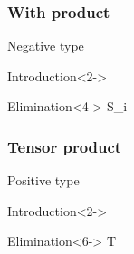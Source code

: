 \documentclass[fleqn]{beamer}
\begin{document}
  \begin{frame}
    \frametitle{With product}
    \begin{block}{}
      Negative type
    \end{block}
    \begin{block}{Introduction}<2->
                {\alert<3>{\ctx{\Gamma}{\Delta}} \vdash {} \ni {}}
    \end{block}
    \begin{block}{Elimination}<4->
                {\alert<5>{\ctx{\Gamma}{\Delta}} \vdash {} \in S_i}
    \end{block}
  \end{frame}
  \begin{frame}
    \frametitle{Tensor product}
    \begin{block}{}
      Positive type
    \end{block}
    \begin{block}{Introduction}<2->
                {\alert<5>{\ctx{\Gamma}{\Delta}} \vdash {} \ni {}}
    \end{block}
    \begin{block}{Elimination}<6->
                {\alert<10>{\ctx{\Gamma}{\Delta}} \vdash {} \in T}
    \end{block}
  \end{frame}
\end{document}
